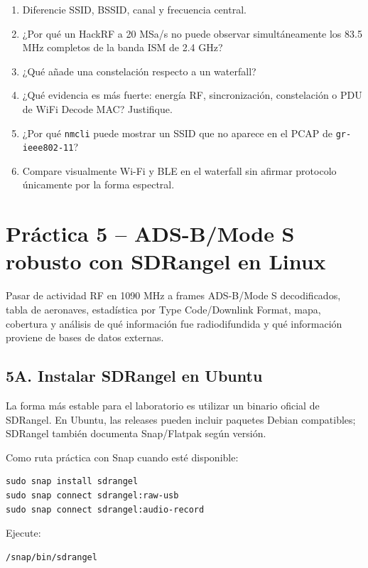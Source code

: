 \begin{enumerate}
    \item Diferencie SSID, BSSID, canal y frecuencia central.
    \item ¿Por qué un HackRF a 20 MSa/s no puede observar simultáneamente los 83.5 MHz completos de la banda ISM de 2.4 GHz?
    \item ¿Qué añade una constelación respecto a un waterfall?
    \item ¿Qué evidencia es más fuerte: energía RF, sincronización, constelación o PDU de WiFi Decode MAC? Justifique.
    \item ¿Por qué \texttt{nmcli} puede mostrar un SSID que no aparece en el PCAP de \texttt{gr-ieee802-11}?
    \item Compare visualmente Wi-Fi y BLE en el waterfall sin afirmar protocolo únicamente por la forma espectral.
\end{enumerate}

\clearpage
\section{Práctica 5 -- ADS-B/Mode S robusto con SDRangel en Linux}

\begin{objetivo}
Pasar de actividad RF en 1090 MHz a frames ADS-B/Mode S decodificados, tabla de aeronaves, estadística por Type Code/Downlink Format, mapa, cobertura y análisis de qué información fue radiodifundida y qué información proviene de bases de datos externas.
\end{objetivo}

\subsection{5A. Instalar SDRangel en Ubuntu}

La forma más estable para el laboratorio es utilizar un binario oficial de SDRangel. En Ubuntu, las releases pueden incluir paquetes Debian compatibles; SDRangel también documenta Snap/Flatpak según versión.

Como ruta práctica con Snap cuando esté disponible:

\begin{lstlisting}
sudo snap install sdrangel
sudo snap connect sdrangel:raw-usb
sudo snap connect sdrangel:audio-record
\end{lstlisting}

Ejecute:

\begin{lstlisting}
/snap/bin/sdrangel
\end{lstlisting}

